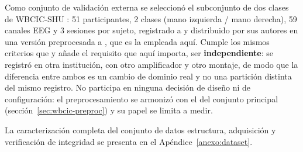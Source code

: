 Como conjunto de validación externa se seleccionó el subconjunto de dos clases de
WBCIC-SHU \cite{yang2025wbcic}: 51 participantes, 2 clases (mano izquierda / mano derecha),
59 canales EEG y 3 sesiones por sujeto, registrado a  y distribuido por sus
autores en una versión preprocesada a , que es la empleada aquí. Cumple
los mismos criterios que \openbmi{} y añade el requisito que aquí importa, ser
\textbf{independiente}: se registró en otra institución, con otro amplificador y otro
montaje, de modo que la diferencia entre ambos es un cambio de dominio real y no una
partición distinta del mismo registro. No participa en ninguna decisión de diseño ni de
configuración: el preprocesamiento se armonizó con el del conjunto principal
(sección~\ref{sec:wbcic-preproc}) y su papel se limita a medir.

La caracterización completa del conjunto de datos estructura, adquisición y
verificación de integridad se presenta en el Apéndice~\ref{anexo:dataset}.

